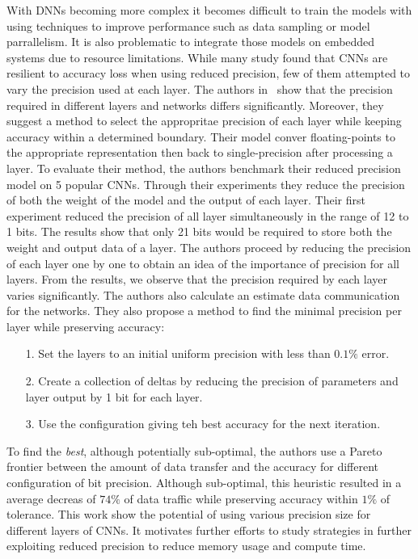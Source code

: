 With DNNs becoming more complex it becomes difficult to train the models with using 
techniques to improve performance such as data sampling or model parrallelism.
It is also problematic to integrate those models on embedded systems due to resource limitations.
While many study found that CNNs are resilient to accuracy loss when using reduced precision,
few of them attempted to vary the precision used at each layer.
The authors in~\cite{Judd2015-kw} show that the precision required in different layers and networks
differs significantly.
Moreover, they suggest a method to select the appropritae precision of each layer while 
keeping accuracy within a determined boundary.
Their model conver floating-points to the appropriate representation then back to single-precision after processing a layer.
To evaluate their method, the authors benchmark their reduced precision model on 5 popular CNNs.
Through their experiments they reduce the precision of both the weight of the model and the output of each layer.
Their first experiment reduced the precision of all layer simultaneously in the range of 12 to 1 bits.
The results show that only 21 bits would be required to store both the weight and output data of a layer.
The authors proceed by reducing the precision of each layer one by one to obtain an idea of the importance of precision for all layers.
From the results, we observe that the precision required by each layer varies significantly.
The authors also calculate an estimate data communication for the networks.
They also propose a method to find the minimal precision per layer while preserving accuracy:
\begin{itemize}
	\item[1.] Set the layers to an initial uniform precision with less than $0.1\%$ error.
	\item[2.] Create a collection of deltas by reducing the precision of parameters and layer output by 1 bit for each layer.
	\item[3.] Use the configuration giving teh best accuracy for the next iteration.
\end{itemize}
To find the \textit{best}, although potentially sub-optimal, the authors use a Pareto
frontier between the amount of data transfer and the accuracy for different configuration of bit precision.
Although sub-optimal, this heuristic resulted in a average decreas of $74\%$ of data traffic
while preserving accuracy within $1\%$ of tolerance.
This work show the potential of using various precision size for different layers of CNNs.
It motivates further efforts to study strategies in further exploiting reduced precision
to reduce memory usage and compute time. 

